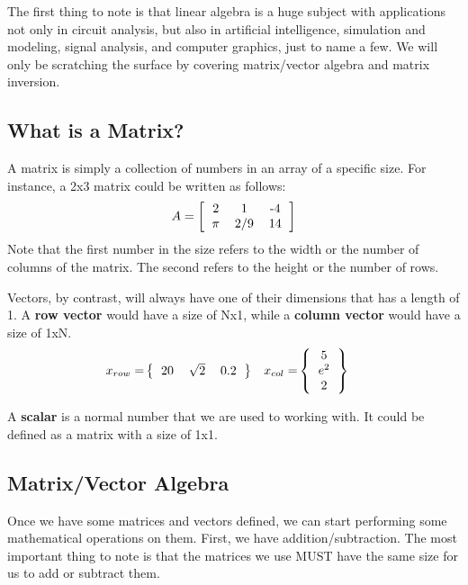The first thing to note is that linear algebra is a huge subject with applications not only in circuit analysis, but also in artificial intelligence, simulation and modeling, signal analysis, and computer graphics, just to name a few.  We will only be scratching the surface by covering matrix/vector algebra and matrix inversion.
\subsection*{What is a Matrix?}
A matrix is simply a collection of numbers in an array of a specific size.
For instance, a 2x3 matrix could be written as follows:
\begin{equation*}
  A = \left[
    \begin{tabular}{ccc}
      2 & 1 & -4 \\
      $\pi$ & $2/9$ & 14
    \end{tabular}
    \right]
\end{equation*}
Note that the first number in the size refers to the width or the number of columns of the matrix.  The second refers to the height or the number of rows.

Vectors, by contrast, will always have one of their dimensions that has a length of 1.  A {\bf row vector} would have a size of Nx1, while a {\bf column vector} would have a size of 1xN.
\begin{align*}
  x_{row} =& \left\{\begin{tabular}{ccc} 20 & $\sqrt{2}$ & 0.2 \end{tabular}\right\} &
  x_{col} =& \left\{\begin{tabular}{c} 5 \\ $e^2$ \\ 2 \end{tabular}\right\}
\end{align*}

A {\bf scalar} is a normal number that we are used to working with.  It could be defined as a matrix with a size of 1x1.

\subsection*{Matrix/Vector Algebra}
Once we have some matrices and vectors defined, we can start performing some mathematical operations on them.  First, we have addition/subtraction.  The most important thing to note is that the matrices we use MUST have the same size for us to add or subtract them.  


